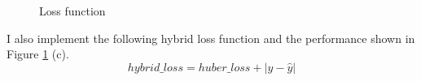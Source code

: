 \documentclass{article}
\begin{document}
\begin{figure}[htbp]
\quad
\quad
{}
\caption{ Loss function}
\label{loss}
\end{figure}

I also implement the following hybrid loss function and the performance shown in Figure \ref{loss} (c). 
$$hybrid\_loss = huber\_loss + |y - \hat{y}|$$
\end{document}
